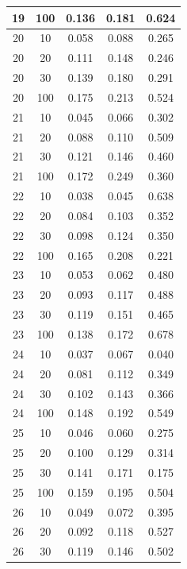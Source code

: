 \begin{longtable}{ |c|c|c|c|c| }
            19 & 100 & 0.136 & 0.181 & 0.624 \\ \hline
            20 & 10 & 0.058 & 0.088 & 0.265 \\ \hline
            20 & 20 & 0.111 & 0.148 & 0.246 \\ \hline
            20 & 30 & 0.139 & 0.180 & 0.291 \\ \hline
            20 & 100 & 0.175 & 0.213 & 0.524 \\ \hline
            21 & 10 & 0.045 & 0.066 & 0.302 \\ \hline
            21 & 20 & 0.088 & 0.110 & 0.509 \\ \hline
            21 & 30 & 0.121 & 0.146 & 0.460 \\ \hline
            21 & 100 & 0.172 & 0.249 & 0.360 \\ \hline
            22 & 10 & 0.038 & 0.045 & 0.638 \\ \hline
            22 & 20 & 0.084 & 0.103 & 0.352 \\ \hline
            22 & 30 & 0.098 & 0.124 & 0.350 \\ \hline
            22 & 100 & 0.165 & 0.208 & 0.221 \\ \hline
            23 & 10 & 0.053 & 0.062 & 0.480 \\ \hline
            23 & 20 & 0.093 & 0.117 & 0.488 \\ \hline
            23 & 30 & 0.119 & 0.151 & 0.465 \\ \hline
            23 & 100 & 0.138 & 0.172 & 0.678 \\ \hline
            24 & 10 & 0.037 & 0.067 & 0.040 \\ \hline
            24 & 20 & 0.081 & 0.112 & 0.349 \\ \hline
            24 & 30 & 0.102 & 0.143 & 0.366 \\ \hline
            24 & 100 & 0.148 & 0.192 & 0.549 \\ \hline
            25 & 10 & 0.046 & 0.060 & 0.275 \\ \hline
            25 & 20 & 0.100 & 0.129 & 0.314 \\ \hline
            25 & 30 & 0.141 & 0.171 & 0.175 \\ \hline
            25 & 100 & 0.159 & 0.195 & 0.504 \\ \hline
            26 & 10 & 0.049 & 0.072 & 0.395 \\ \hline
            26 & 20 & 0.092 & 0.118 & 0.527 \\ \hline
            26 & 30 & 0.119 & 0.146 & 0.502 \\ \hline

\end{longtable}
